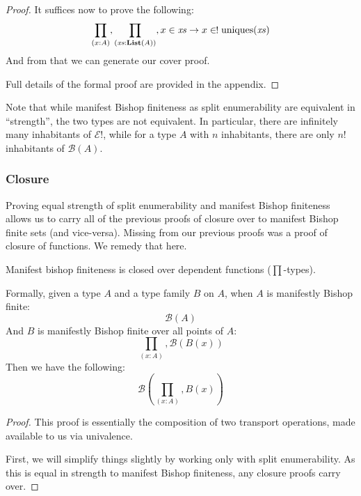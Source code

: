 \begin{refsection}
\begin{proof}
  It suffices now to prove the following:
  \begin{equation}
    \prod_{(x : A)} , \prod_{(\mathit{xs} : \textbf{List}(A))} , x \in \mathit{xs} \rightarrow x \inunique \text{uniques}(\mathit{xs})
  \end{equation}
  And from that we can generate our cover proof.

  Full details of the formal proof are provided in the appendix.
\end{proof}
Note that while manifest Bishop finiteness as split enumerability are equivalent
in ``strength'', the two types are not equivalent.
In particular, there are infinitely many inhabitants of \(\mathcal{E}!\), while
for a type \(A\) with \(n\) inhabitants, there are only \(n!\) inhabitants of
\(\mathcal{B}(A)\).
\subsubsection{Closure}
Proving equal strength of split enumerability and manifest Bishop finiteness
allows us to carry all of the previous proofs of closure over to manifest Bishop
finite sets (and vice-versa).
Missing from our previous proofs was a proof of closure of functions.
We remedy that here.
\begin{theorem}
  Manifest bishop finiteness is closed over dependent functions (\(\prod\)-types).

  Formally, given a type \(A\) and a type family \(B\) on \(A\), when \(A\) is
  manifestly Bishop finite:
  \begin{equation}
    \mathcal{B}\left( A \right)
  \end{equation}
  And \(B\) is manifestly Bishop finite over all points of \(A\):
  \begin{equation}
    \prod_{(x : A)} , \mathcal{B}\left( B(x) \right)
  \end{equation}
  Then we have the following:
  \begin{equation}
    \mathcal{B}\left(\prod_{(x : A)} , B(x)\right)
  \end{equation}
\end{theorem}
\begin{proof}
  This proof is essentially the composition of two transport operations, made
  available to us via univalence.
  
  First, we will simplify things slightly by working only with split
  enumerability.
  As this is equal in strength to manifest Bishop finiteness, any closure proofs
  carry over.


\end{proof}
\end{refsection}
